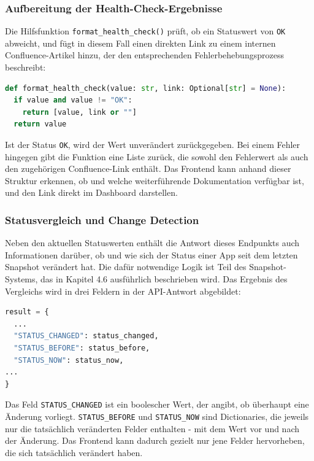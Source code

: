 \subsubsection{Aufbereitung der Health-Check-Ergebnisse}
Die Hilfsfunktion \texttt{format\_health\_check()} prüft, ob ein Statuswert von \texttt{OK} abweicht, und fügt in diesem Fall einen direkten Link zu einem internen Confluence-Artikel hinzu, der den entsprechenden Fehlerbehebungsprozess beschreibt:

\begin{lstlisting}[language=Python, caption={Hilfsfunktion format\_health\_check}, label={lst:format-health-check}]
def format_health_check(value: str, link: Optional[str] = None):
  if value and value != "OK":
    return [value, link or ""]
  return value
\end{lstlisting}

Ist der Status \texttt{OK}, wird der Wert unverändert zurückgegeben. Bei einem Fehler hingegen gibt die Funktion eine Liste zurück, die sowohl den Fehlerwert als auch den zugehörigen Confluence-Link enthält. Das Frontend kann anhand dieser Struktur erkennen, ob und welche weiterführende Dokumentation verfügbar ist, und den Link direkt im Dashboard darstellen.

\subsubsection{Statusvergleich und Change Detection}
Neben den aktuellen Statuswerten enthält die Antwort dieses Endpunkts auch Informationen darüber, ob und wie sich der Status einer App seit dem letzten Snapshot verändert hat. Die dafür notwendige Logik ist Teil des Snapshot-Systems, das in Kapitel 4.6 ausführlich beschrieben wird. Das Ergebnis des Vergleichs wird in drei Feldern in der API-Antwort abgebildet:

\begin{lstlisting}[language=Python, caption={Statusänderungsfelder in der API-Antwort}, label={lst:status-changed}]
result = {
  ...
  "STATUS_CHANGED": status_changed,
  "STATUS_BEFORE": status_before,
  "STATUS_NOW": status_now,
...
}
\end{lstlisting}

Das Feld \texttt{STATUS\_CHANGED} ist ein boolescher Wert, der angibt, ob überhaupt eine Änderung vorliegt. \texttt{STATUS\_BEFORE} und \texttt{STATUS\_NOW} sind Dictionaries, die jeweils nur die tatsächlich veränderten Felder enthalten - mit dem Wert vor und nach der Änderung. Das Frontend kann dadurch gezielt nur jene Felder hervorheben, die sich tatsächlich verändert haben.

